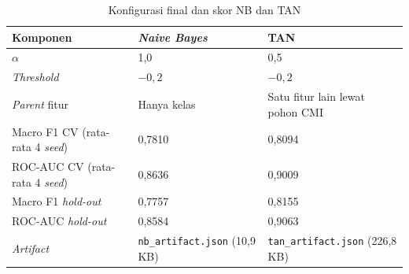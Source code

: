 \begin{table}[H]
	\centering
	\caption{Konfigurasi final dan skor NB dan TAN}
	\label{tab:nb-final}
	\begin{tabularx}{\textwidth}{l Y Y}
		\toprule
		\textbf{Komponen} & \textbf{\textit{Naive Bayes}} & \textbf{TAN} \\
		\midrule
		$\alpha$ & 1,0 & 0,5 \\
		\textit{Threshold} & $-0{,}2$ & $-0{,}2$ \\
		\textit{Parent} fitur & Hanya kelas & Satu fitur lain lewat pohon CMI \\
		Macro F1 CV (rata-rata 4 \textit{seed}) & 0,7810 & 0,8094 \\
		ROC-AUC CV (rata-rata 4 \textit{seed}) & 0,8636 & 0,9009 \\
		Macro F1 \textit{hold-out} & 0,7757 & 0,8155 \\
		ROC-AUC \textit{hold-out} & 0,8584 & 0,9063 \\
		\textit{Artifact} & \texttt{nb\_artifact.json} (10,9 KB) & \texttt{tan\_artifact.json} (226,8 KB) \\
		\bottomrule
	\end{tabularx}
\end{table}
